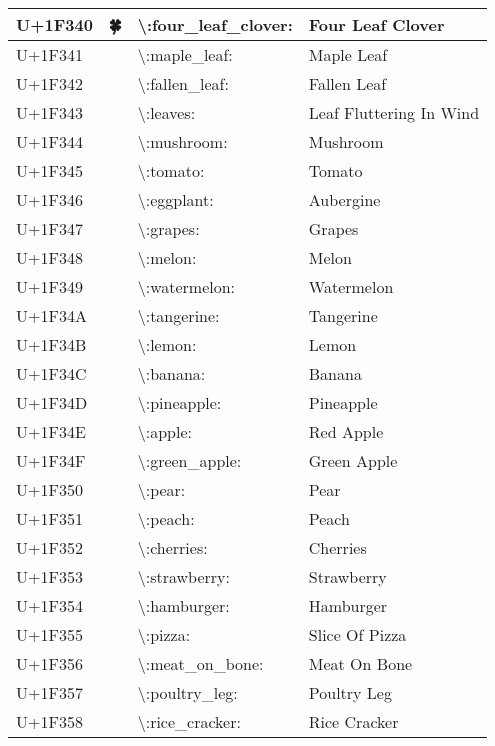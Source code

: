 \begin{table}[h]
\begin{tabulary}{\linewidth}{|L|L|L|L|}
\hline
U+1F340 & 🍀 & {\textbackslash}:four\_leaf\_clover: & Four Leaf Clover \\
\hline
U+1F341 & 🍁 & {\textbackslash}:maple\_leaf: & Maple Leaf \\
\hline
U+1F342 & 🍂 & {\textbackslash}:fallen\_leaf: & Fallen Leaf \\
\hline
U+1F343 & 🍃 & {\textbackslash}:leaves: & Leaf Fluttering In Wind \\
\hline
U+1F344 & 🍄 & {\textbackslash}:mushroom: & Mushroom \\
\hline
U+1F345 & 🍅 & {\textbackslash}:tomato: & Tomato \\
\hline
U+1F346 & 🍆 & {\textbackslash}:eggplant: & Aubergine \\
\hline
U+1F347 & 🍇 & {\textbackslash}:grapes: & Grapes \\
\hline
U+1F348 & 🍈 & {\textbackslash}:melon: & Melon \\
\hline
U+1F349 & 🍉 & {\textbackslash}:watermelon: & Watermelon \\
\hline
U+1F34A & 🍊 & {\textbackslash}:tangerine: & Tangerine \\
\hline
U+1F34B & 🍋 & {\textbackslash}:lemon: & Lemon \\
\hline
U+1F34C & 🍌 & {\textbackslash}:banana: & Banana \\
\hline
U+1F34D & 🍍 & {\textbackslash}:pineapple: & Pineapple \\
\hline
U+1F34E & 🍎 & {\textbackslash}:apple: & Red Apple \\
\hline
U+1F34F & 🍏 & {\textbackslash}:green\_apple: & Green Apple \\
\hline
U+1F350 & 🍐 & {\textbackslash}:pear: & Pear \\
\hline
U+1F351 & 🍑 & {\textbackslash}:peach: & Peach \\
\hline
U+1F352 & 🍒 & {\textbackslash}:cherries: & Cherries \\
\hline
U+1F353 & 🍓 & {\textbackslash}:strawberry: & Strawberry \\
\hline
U+1F354 & 🍔 & {\textbackslash}:hamburger: & Hamburger \\
\hline
U+1F355 & 🍕 & {\textbackslash}:pizza: & Slice Of Pizza \\
\hline
U+1F356 & 🍖 & {\textbackslash}:meat\_on\_bone: & Meat On Bone \\
\hline
U+1F357 & 🍗 & {\textbackslash}:poultry\_leg: & Poultry Leg \\
\hline
U+1F358 & 🍘 & {\textbackslash}:rice\_cracker: & Rice Cracker \\

\end{tabulary}
\end{table}
